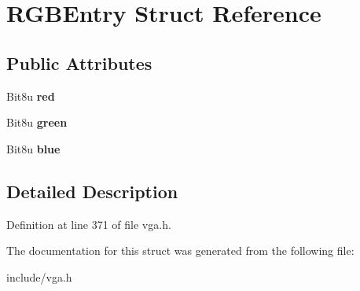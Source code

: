 \hypertarget{structRGBEntry}{\section{R\-G\-B\-Entry Struct Reference}
\label{structRGBEntry}
}
\subsection*{Public Attributes}
\begin{DoxyCompactItemize}
\item 
\hypertarget{structRGBEntry_a51c517e90d0d1bab872e5fdee34a60bc}{Bit8u {\bfseries red}}\label{structRGBEntry_a51c517e90d0d1bab872e5fdee34a60bc}

\item 
\hypertarget{structRGBEntry_adc6713003c2ad77cc873d56e74135362}{Bit8u {\bfseries green}}\label{structRGBEntry_adc6713003c2ad77cc873d56e74135362}

\item 
\hypertarget{structRGBEntry_a96944c8a46f4ae70ec99e8e33d117627}{Bit8u {\bfseries blue}}\label{structRGBEntry_a96944c8a46f4ae70ec99e8e33d117627}

\end{DoxyCompactItemize}


\subsection{Detailed Description}


Definition at line 371 of file vga.\-h.



The documentation for this struct was generated from the following file\-:\begin{DoxyCompactItemize}
\item 
include/vga.\-h\end{DoxyCompactItemize}
